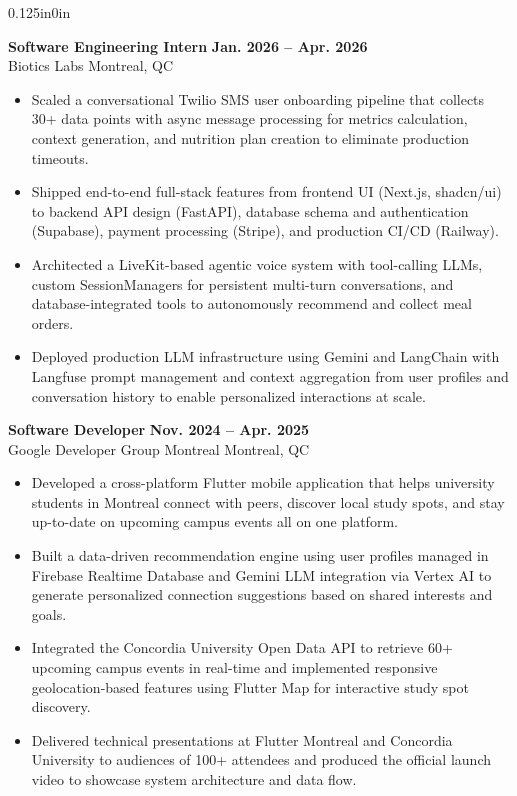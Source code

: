 \documentclass[11pt]{article}
\begin{document}
\begin{adjustwidth}{0.125in}{0in}
\begin{itemize}
        \end{itemize}
        \textbf{Software Engineering Intern} \hfill \textbf{Jan. 2026  -- Apr. 2026}\\
        Biotics Labs \hfill Montreal, QC
        \begin{itemize}
            \item Scaled a conversational Twilio SMS user onboarding pipeline that collects 30+ data points with async message processing for metrics calculation, context generation, and nutrition plan creation to eliminate production timeouts.
            \item Shipped end-to-end full-stack features from frontend UI (Next.js, shadcn/ui) to backend API design (FastAPI), database schema and authentication (Supabase), payment processing (Stripe), and production CI/CD (Railway).
            \item Architected a LiveKit-based agentic voice system with tool-calling LLMs, custom SessionManagers for persistent multi-turn conversations, and database-integrated tools to autonomously recommend and collect meal orders.
            \item Deployed production LLM infrastructure using Gemini and LangChain with Langfuse prompt management and context aggregation from user profiles and conversation history to enable personalized interactions at scale.
        \end{itemize}
        \textbf{Software Developer} \hfill \textbf{Nov. 2024 -- Apr. 2025}\\
        Google Developer Group Montreal \hfill Montreal, QC
        \begin{itemize}
            \item Developed a cross-platform Flutter mobile application that helps university students in Montreal connect with peers, discover local study spots, and stay up-to-date on upcoming campus events all on one platform. 
            \item Built a data-driven recommendation engine using user profiles managed in Firebase Realtime Database and Gemini LLM integration via Vertex AI to generate personalized connection suggestions based on shared interests and goals.
            \item Integrated the Concordia University Open Data API to retrieve 60+ upcoming campus events in real-time and implemented responsive geolocation-based features using Flutter Map for interactive study spot discovery.
            \item Delivered technical presentations at Flutter Montreal and Concordia University to audiences of 100+ attendees and produced the official launch video to showcase system architecture and data flow.
        \end{itemize}
    \end{adjustwidth}
\end{document}
